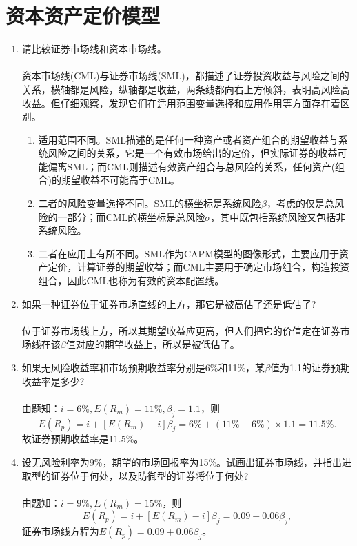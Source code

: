 \section{资本资产定价模型}
\begin{enumerate}
    \item 请比较证券市场线和资本市场线。\\
    \sol\\
    资本市场线(CML)与证券市场线(SML)，都描述了证券投资收益与风险之间的关系，横轴都是风险，纵轴都是收益，两条线都向右上方倾斜，表明高风险高收益。但仔细观察，发现它们在适用范围变量选择和应用作用等方面存在着区别。
    \begin{enumerate}[label=(\arabic*)]
        \item 适用范围不同。SML描述的是任何一种资产或者资产组合的期望收益与系统风险之间的关系，它是一个有效市场给出的定价，但实际证券的收益可能偏离SML；而CML则描述有效资产组合与总风险的关系，任何资产(组合)的期望收益不可能高于CML。
        \item 二者的风险变量选择不同。SML的横坐标是系统风险$\beta$，考虑的仅是总风险的一部分；而CML的横坐标是总风险$\sigma$，其中既包括系统风险又包括非系统风险。
        \item 二者在应用上有所不同。SML作为CAPM模型的图像形式，主要应用于资产定价，计算证券的期望收益；而CML主要用于确定市场组合，构造投资组合，因此CML也称为有效的资本配置线。
    \end{enumerate}
    \item 如果一种证券位于证券市场直线的上方，那它是被高估了还是低估了?\\
    \sol\\
    位于证券市场线上方，所以其期望收益应更高，但人们把它的价值定在证券市场线在该$\beta$值对应的期望收益上，所以是被低估了。
    \item 如果无风险收益率和市场预期收益率分别是6\%和11\%，某$\beta$值为1.1的证券预期收益率是多少?\\
    \sol\\
    由题知：$i = 6\%, E(R_m) = 11\%, \beta_j = 1.1$，则
    \[E(R_p) = i + [E(R_m) - i]\beta_j = 6\% + (11\% - 6\%) \times 1.1 = 11.5\%.\]
    故证券预期收益率是11.5\%。
    \item 设无风险利率为9\%，期望的市场回报率为15\%。试画出证券市场线，并指出进取型的证券位于何处，以及防御型的证券将位于何处?\\
    \sol\\
    由题知：$i = 9\%, E(R_m) = 15\%$，则
    \[E(R_p) = i + [E(R_m) - i]\beta_j = 0.09 + 0.06\beta_j,\]
    证券市场线方程为$E(R_p) = 0.09 + 0.06\beta_j$。\\

\end{enumerate}
